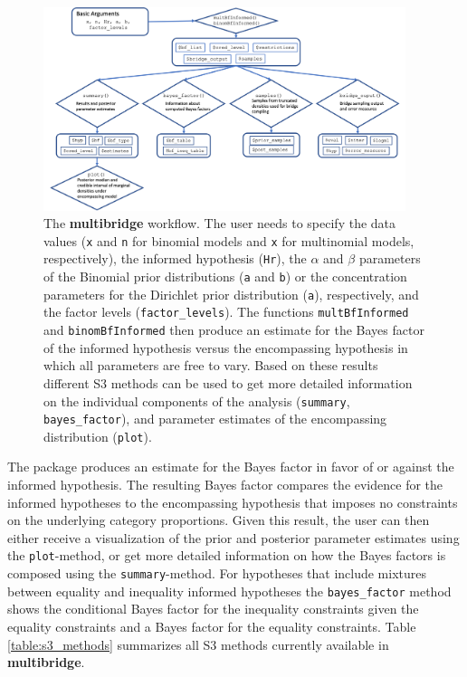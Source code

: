 \documentclass[
  english,
  man,floatsintext]{apa6}
\begin{document}
\begin{figure}
\includegraphics[width=400px]{scheme_multibridge} \caption{The \textbf{multibridge} workflow. The user needs to specify the data values (\texttt{x} and \texttt{n} for binomial models and \texttt{x} for multinomial models, respectively), the informed hypothesis (\texttt{Hr}), the \(\alpha\) and \(\beta\) parameters of the Binomial prior distributions (\texttt{a} and \texttt{b}) or the concentration parameters for the Dirichlet prior distribution (\texttt{a}), respectively, and the factor levels (\texttt{factor\_levels}). The functions \texttt{multBfInformed} and \texttt{binomBfInformed} then produce an estimate for the Bayes factor of the informed hypothesis versus the encompassing hypothesis in which all parameters are free to vary. Based on these results different S3 methods can be used to get more detailed information on the individual components of the analysis (\texttt{summary}, \texttt{bayes\_factor}), and parameter estimates of the encompassing distribution (\texttt{plot}).}\label{fig:scheme-multibridge}
\end{figure}

The package produces an estimate for the Bayes factor in favor of or against the informed hypothesis. The resulting Bayes factor compares the evidence for the informed hypotheses to the encompassing hypothesis that imposes no constraints on the underlying category proportions. Given this result, the user can then either receive a visualization of the prior and posterior parameter estimates using the \texttt{plot}-method, or get more detailed information on how the Bayes factors is composed using the \texttt{summary}-method. For hypotheses that include mixtures between equality and inequality informed hypotheses the \texttt{bayes\_factor} method shows the conditional Bayes factor for the inequality constraints given the equality constraints and a Bayes factor for the equality constraints. Table \ref{table:s3_methods} summarizes all S3 methods currently available in \textbf{multibridge}.
\end{document}
